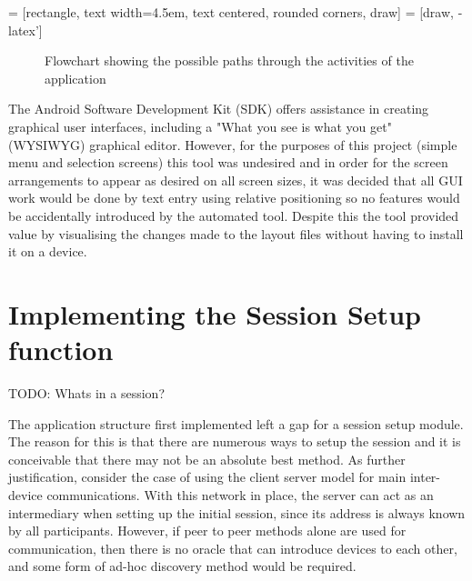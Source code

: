  = [rectangle, text width=4.5em, text centered, rounded corners, draw]
 = [draw, -latex']
\begin{figure}[ht]
\centering
{}
\caption{Flowchart showing the possible paths through the activities of the application}
\label{fig:menu_structure}
\end{figure}

The Android Software Development Kit (SDK) offers assistance in creating graphical user interfaces, including a "What you see is what you get" (WYSIWYG) graphical editor. However, for the purposes of this project (simple menu and selection screens) this tool was undesired and in order for the screen arrangements to appear as desired on all screen sizes, it was decided that all GUI work would be done by text entry using relative positioning so no features would be accidentally introduced by the automated tool. Despite this the tool provided value by visualising the changes made to the layout files without having to install it on a device.

\section{Implementing the Session Setup function}

TODO: Whats in a session?

The application structure first implemented left a gap for a session setup module. The reason for this is that there are numerous ways to setup the session and it is conceivable that there may not be an absolute best method.
As further justification, consider the case of using the client server model for main inter-device communications. With this network in place, the server can act as an intermediary when setting up the initial session, since its address is always known by all participants. However, if peer to peer methods alone are used for communication, then there is no oracle that can introduce devices to each other, and some form of ad-hoc discovery method would be required.


